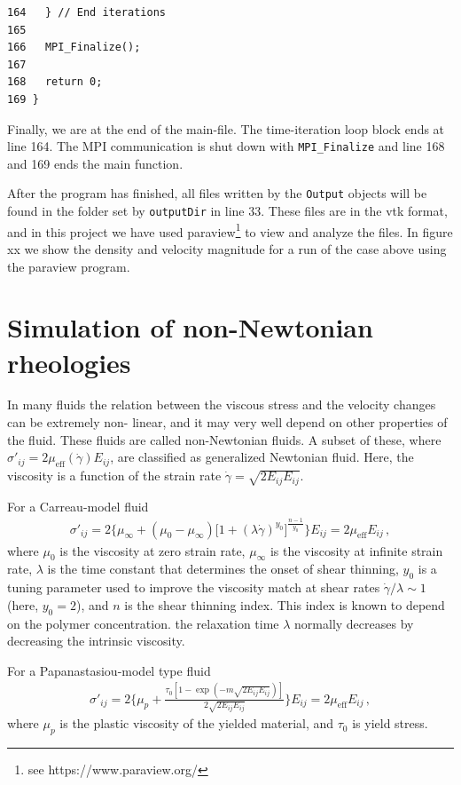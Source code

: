 \documentclass[11pt,a4paper]{report}
\begin{document}
\begin{verbatim}
164   } // End iterations
165
166   MPI_Finalize();
167
168   return 0;
169 }
\end{verbatim}
Finally, we are at the end of the main-file. The time-iteration loop block ends at line 164. The MPI communication is shut down with \texttt{MPI\_Finalize} and line 168 and 169 ends the main function.

After the program has finished, all files written by the \texttt{Output} objects will be found in the folder set by \texttt{outputDir} in line 33. These files are in the vtk format, and in this project we have used paraview\footnote{see https://www.paraview.org/} to view and analyze the files.  In figure xx we show the density and velocity magnitude for a run of the case above using the paraview program.
 

\chapter{Simulation of non-Newtonian rheologies}
\label{sec:simulation of non-Newtonian rheologies}
In many fluids the relation between the viscous stress and the velocity changes can be extremely non-
linear, and it may very well depend on other properties of the fluid. These fluids are called non-Newtonian fluids. A subset of these, where ${\sigma'_{i j} = 2\mu_\mathrm{eff}(\dot{\gamma}) E_{ij}}$, are classified as generalized Newtonian fluid. Here, the viscosity is a function of the strain rate ${\dot{\gamma}=\sqrt{2E_{ij}E_{ij}}}$.

For a Carreau-model fluid
\begin{align}
\sigma'_{i j} = 2\bigg\{\mu_\infty + \left(\mu_0 -\mu_\infty\right)\big[1 + (\lambda \dot{\gamma})^{y_0} \big]^{\frac{n-1}{y_0}} \bigg\} E_{ij}
= 2\mu_\mathrm{eff} E_{ij} \, ,\label{eq:carreau}
\end{align}
where $\mu_0$ is the viscosity at zero strain rate, $\mu_\infty$ is the viscosity at infinite strain rate, $\lambda$ is the time constant that determines the onset of shear thinning, $y_0$ is a tuning parameter used
to improve the viscosity match at shear rates ${\dot{\gamma}/\lambda}\sim 1$ (here, ${y_0 = 2}$), and $n$ is the shear thinning index. This index is known to depend on the
polymer concentration. the relaxation time $\lambda$ normally decreases by decreasing the intrinsic viscosity. 

For a Papanastasiou-model type fluid \cite{papanastasiou1987flows}
\begin{align}
\sigma'_{i j} = 2\Bigg\{\mu_p + \frac{\tau_0 \left[1-\exp\left(-m \sqrt{2E_{ij}E_{ij}}\right)\right]}{2\sqrt{2E_{ij}E_{ij}}} \Bigg\} E_{ij} = 2\mu_\mathrm{eff} E_{ij} \, ,
\end{align}
where $\mu_p$ is the plastic viscosity of the yielded material, and $\tau_0$ is yield stress.
\end{document}
